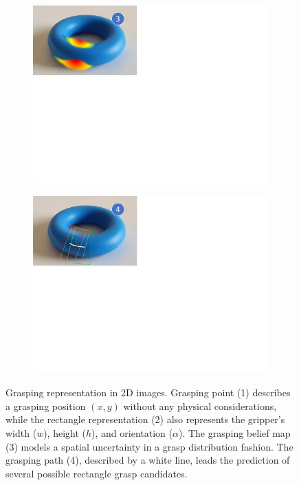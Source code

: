 \begin{figure}[h!]
{\begin{tcolorbox}
\begin{subfigure}[c]{0.45\textwidth}
			\end{subfigure}
			\hfill
			\begin{subfigure}[c]{0.45\textwidth}
				\centering
				\includegraphics[trim={19mm 162mm 215mm 8mm},clip,width=1\columnwidth,angle=0]{Cap2/Figuras/myBeliefMap.pdf}
			\end{subfigure}
			\hfill
			\begin{subfigure}[c]{0.45\textwidth}
				\centering
				\includegraphics[trim={19mm 162mm 215mm 8mm},clip,width=1\linewidth,angle=0]{Cap2/Figuras/myGraspPath.pdf}
			\end{subfigure}
		\end{tcolorbox}
		\caption{Grasping representation in 2D images. Grasping point (1) describes a grasping position $(x,y)$ without any physical considerations, while the rectangle representation (2) also represents the gripper's width ($w$), height ($h$), and orientation ($\alpha$). The grasping belief map (3) models a spatial uncertainty in a grasp distribution fashion. The grasping path (4), described by a white line, leads the prediction of several possible rectangle grasp candidates.}
		\label{fig:exemples_rep}
	}%
\end{figure}
